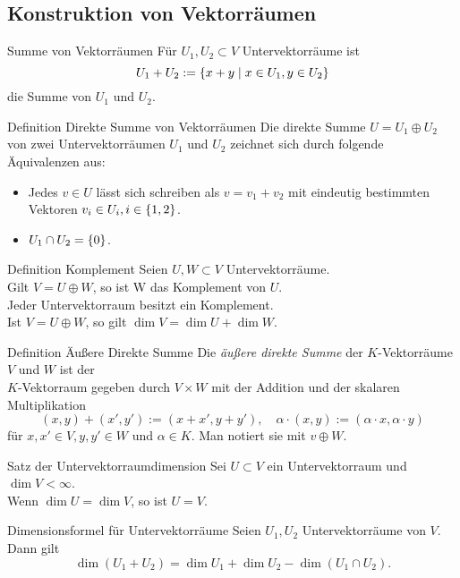 \documentclass[main.tex]{subfiles}
\begin{document}
\subsection*{Konstruktion von Vektorräumen}
\begin{karte}{Summe von Vektorräumen}
    Für \(U_1, U_2 \subset V\) Untervektorräume ist 
    \[U_1 + U_2 := \{x + y \;\vert \; x \in U_1, y \in U_2\}\]
    die Summe von \(U_1\) und \(U_2\).
\end{karte}
\begin{karte}{Definition Direkte Summe von Vektorräumen}
    Die direkte Summe \(U = U_1 \oplus U_2\) von zwei 
    Untervektorräumen \(U_1\) und \(U_2\) zeichnet sich durch 
    folgende Äquivalenzen aus: 
    \begin{itemize}
        \item Jedes \(v \in U\) lässt sich schreiben als 
        \(v = v_1 + v_2\) mit eindeutig bestimmten Vektoren
        \(v_i \in U_i, i \in \{1,2\}\).
        \item \(U_1 \cap U_2 = \{0\}\).
    \end{itemize}
\end{karte}
\begin{karte}{Definition Komplement}
    Seien \(U,W \subset V\) Untervektorräume.\\
    Gilt \(V = U \oplus W\), so ist W das Komplement von \(U\). \\
    Jeder Untervektorraum besitzt ein Komplement.\\
    Ist \( V = U \oplus W \), so gilt \( \dim V = \dim U + \dim W \).
\end{karte}
\begin{karte}{Definition Äußere Direkte Summe}
    Die \textit{äußere direkte Summe} der \(K\)-Vektorräume \(V\) 
    und \(W\) ist der\\
    \(K\)-Vektorraum gegeben durch \( V \times W \) 
    mit der Addition und der skalaren Multiplikation 
    \[ (x,y) + (x',y') := (x + x', y + y'), \quad 
    \alpha \cdot (x,y) := (\alpha \cdot x, \alpha \cdot y) \]
    für \( x,x' \in V, y,y' \in W \) und \( \alpha \in K \). 
    Man notiert sie mit \( v \oplus W \).
\end{karte}
\begin{karte}{Satz der Untervektorraumdimension}
    Sei \( U \subset V \) ein Untervektorraum und \( \dim V < \infty \). \\
    Wenn \( \dim U = \dim V \), so ist \( U = V \).
\end{karte}
\begin{karte}{Dimensionsformel für Untervektorräume}
    Seien \( U_1, U_2 \) Untervektorräume von \(V\). Dann gilt 
    \[ \dim(U_1 + U_2) = \dim U_1 + \dim U_2 - \dim(U_1 \cap U_2). \]
\end{karte}
\end{document}
